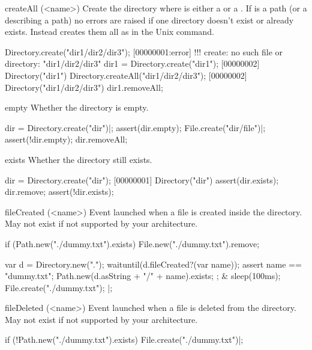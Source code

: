 \begin{urbiscriptapi}
\item[createAll](<name>)
  Create the directory  where  is either a
   or a . If  is a
  path (or a  describing a path) no errors are
  raised if one directory doesn't exist or already exists. Instead
   creates them all as in the Unix  command.
\begin{urbiscript}
Directory.create("dir1/dir2/dir3");
[00000001:error] !!! create: no such file or directory: "dir1/dir2/dir3"
dir1 = Directory.create("dir1");
[00000002] Directory("dir1")
Directory.createAll("dir1/dir2/dir3");
[00000002] Directory("dir1/dir2/dir3")
dir1.removeAll;
\end{urbiscript}

\item[empty]
  Whether the directory is empty.
\begin{urbiscript}
dir = Directory.create("dir")|;
assert(dir.empty);
File.create("dir/file")|;
assert(!dir.empty);
dir.removeAll;
\end{urbiscript}

\item[exists]
  Whether the directory still exists.
\begin{urbiscript}
dir = Directory.create("dir");
[00000001] Directory("dir")
assert(dir.exists);
dir.remove;
assert(!dir.exists);
\end{urbiscript}

\item[fileCreated](<name>)%
  Event launched when a file is created inside the directory.
  May not exist if not supported by your architecture.

\begin{urbiscript}[firstnumber=1]
if (Path.new("./dummy.txt").exists)
  File.new("./dummy.txt").remove;

  {
    var d = Directory.new(".");
    waituntil(d.fileCreated?(var name));
    assert
    {
      name == "dummy.txt";
      Path.new(d.asString + "/" + name).exists;
    };
  }
&
  {
    sleep(100ms);
    File.create("./dummy.txt");
  }|;
\end{urbiscript}

\item[fileDeleted](<name>)%
  Event launched when a file is deleted from the directory.  May not exist
  if not supported by your architecture.

\begin{urbiscript}
if (!Path.new("./dummy.txt").exists)
  File.create("./dummy.txt")|;


\end{urbiscript}
\end{urbiscriptapi}
